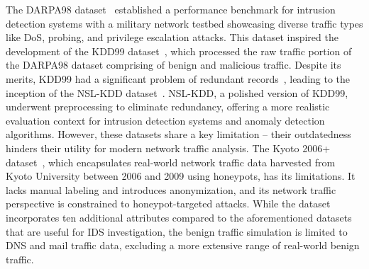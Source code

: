 \documentclass[lettersize,journal]{IEEEtran}
\begin{document}
The DARPA98 dataset~\cite{mit1998DARPA} established a performance benchmark for intrusion detection systems with a military network testbed showcasing diverse traffic types like \ac{DoS}, probing, and privilege escalation attacks. This dataset inspired the development of the KDD99 dataset~\cite{stolfoKDD}, which processed the raw traffic portion of the DARPA98 dataset comprising of benign and malicious traffic. Despite its merits, KDD99 had a significant problem of redundant records~\cite{tavallaee2009NSLKDD}, leading to the inception of the NSL-KDD dataset~\cite{tavallaee2009NSLKDD}. NSL-KDD, a polished version of KDD99, underwent preprocessing to eliminate redundancy, offering a more realistic evaluation context for intrusion detection systems and anomaly detection algorithms. However, these datasets share a key limitation -- their outdatedness hinders their utility for modern network traffic analysis. The Kyoto 2006+ dataset~\cite{kyoto}, which encapsulates real-world network traffic data harvested from Kyoto University between 2006 and 2009 using honeypots, has its limitations. It lacks manual labeling and introduces anonymization, and its network traffic perspective is constrained to honeypot-targeted attacks.  While the dataset incorporates ten additional attributes compared to the aforementioned datasets that are useful for IDS investigation, the benign traffic simulation is limited to \ac{DNS} and mail traffic data, excluding a more extensive range of real-world benign traffic. 
\end{document}

